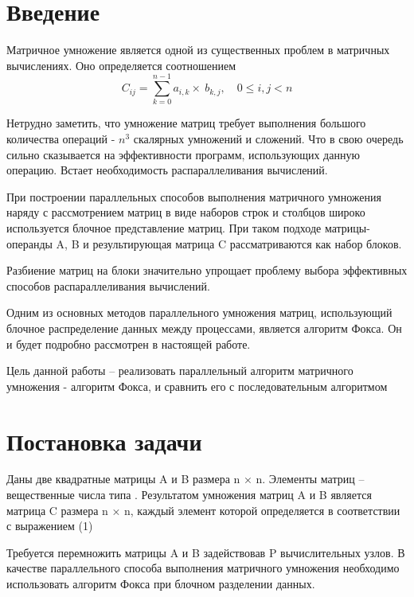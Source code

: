 \documentclass{report}
\begin{document}
\setcounter{page}{2}

\tableofcontents
\newpage



\section*{Введение}
Матричное умножение является одной из существенных проблем в матричных
вычислениях. Оно определяется соотношением
 \begin{equation}\label{key}
	C_{ij} = \sum_{k=0}^{n-1} a_{i,k} \times\ b_{k,j} , \quad 0 \leq i,j < n
\end{equation}
\par Нетрудно заметить, что умножение матриц требует выполнения большого количества
операций - \begin{math} n^{3} \end{math} скалярных умножений и сложений. Что в свою очередь сильно сказывается на
эффективности программ, использующих данную операцию. Встает необходимость
распараллеливания вычислений.
\par При построении параллельных способов выполнения матричного умножения наряду с
рассмотрением матриц в виде наборов строк и столбцов широко используется блочное
представление матриц. При таком подходе матрицы-операнды A, B и результирующая
матрица C рассматриваются как набор блоков.
\par Разбиение матриц на блоки значительно упрощает проблему выбора эффективных
способов распараллеливания вычислений.
\par Одним из основных методов параллельного умножения матриц, использующий блочное
распределение данных между процессами, является алгоритм Фокса. Он и будет подробно
рассмотрен в настоящей работе.
\par Цель данной работы – реализовать параллельный алгоритм матричного умножения -
алгоритм Фокса, и сравнить его с последовательным алгоритмом


\section*{Постановка задачи}
Даны две квадратные матрицы A и B размера n × n. Элементы матриц – вещественные
числа типа . Результатом умножения матриц A и B является матрица C размера n × n,
каждый элемент которой определяется в соответствии с выражением (1)
\par Требуется перемножить матрицы A и B задействовав P вычислительных узлов. В
качестве параллельного способа выполнения матричного умножения необходимо
использовать алгоритм Фокса при блочном разделении данных.
\end{document}

